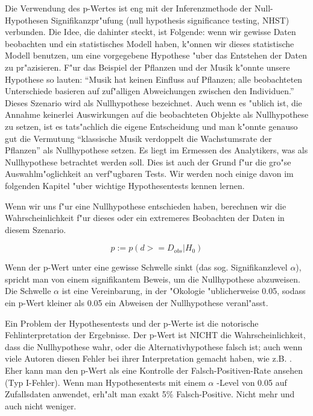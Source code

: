 \documentclass[a4paper,twoside]{tufte-book}\usepackage[]{graphicx}\usepackage[]{color}
\begin{document}
Die Verwendung des p-Wertes ist eng mit der Inferenzmethode der Null-Hypothesen Signifikanzpr"ufung (null hypothesis significance testing, NHST) verbunden. Die Idee, die dahinter steckt, ist Folgende: wenn wir gewisse Daten beobachten und ein statistisches Modell haben, k"onnen wir dieses statistische Modell benutzen, um eine vorgegebene Hypothese "uber das Entstehen der Daten zu pr"azisieren. F"ur das Beispiel der Pflanzen und der Musik k"onnte unsere Hypothese so lauten: "`Musik hat keinen Einfluss auf Pflanzen; alle beobachteten Unterschiede basieren auf zuf"alligen Abweichungen zwischen den Individuen."' Dieses Szenario wird als Nullhypothese bezeichnet.  Auch wenn es "ublich ist, die Annahme keinerlei Auswirkungen auf die beobachteten Objekte als Nullhypothese zu setzen, ist es tats"achlich die eigene Entscheidung und man k"onnte genauso gut die Vermutung "`klassische Musik verdoppelt die Wachstumsrate der Pflanzen"' als Nullhypothese setzen. Es liegt im Ermessen des Analytikers, was als Nullhypothese betrachtet werden soll. Dies ist auch der Grund f"ur die gro"se Auswahlm"oglichkeit an verf"ugbaren Tests. Wir werden noch einige davon im folgenden Kapitel "uber wichtige Hypothesentests kennen lernen.

Wenn wir uns f"ur eine Nullhypothese entschieden haben, berechnen wir die Wahrscheinlichkeit f"ur dieses oder ein extremeres Beobachten der Daten in diesem Szenario.  

\begin{equation}
p := p(d >= D_{obs} | H_0)
\end{equation}

Wenn der p-Wert unter eine gewisse Schwelle sinkt (das sog. Signifikanzlevel $\alpha$), spricht man von einem signifikantem Beweis, um die Nullhypothese abzuweisen. Die Schwelle $\alpha$ ist eine Vereinbarung, in der "Okologie "ublicherweise 0.05, sodass ein p-Wert kleiner als 0.05 ein Abweisen der Nullhypothese veranl"asst.  

Ein Problem der Hypothesentests und der p-Werte ist die notorische Fehlinterpretation der Ergebnisse. Der p-Wert ist NICHT die Wahrscheinlichkeit, dass die Nullhypothese wahr, oder die Alternativhypothese falsch ist; auch wenn viele Autoren diesen Fehler bei ihrer Interpretation gemacht haben, wie z.B. \citep[][]{Cohen-earthisround-1994}. Eher kann man den p-Wert als eine Kontrolle der Falsch-Positiven-Rate ansehen (Typ I-Fehler). Wenn man Hypothesentests mit einem $\alpha$ -Level von 0.05 auf Zufallsdaten anwendet, erh"alt man exakt 5\% Falsch-Positive. Nicht mehr und auch nicht weniger.  
\end{document}
